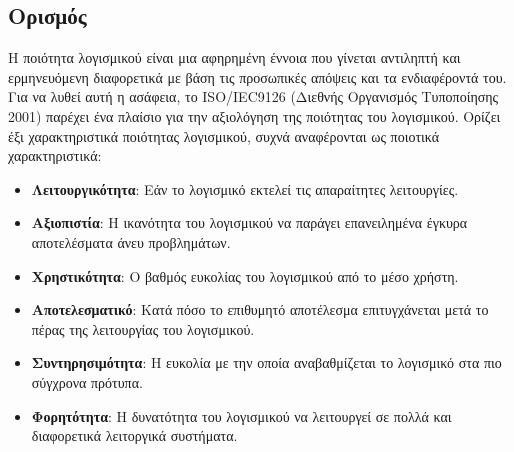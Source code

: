 \documentclass{article}
\begin{document}
{{\subsection{Ορισμός}
Η ποιότητα λογισμικού είναι μια αφηρημένη έννοια που γίνεται αντιληπτή και ερμηνευόμενη διαφορετικά
με βάση τις προσωπικές απόψεις και τα ενδιαφέροντά του. Για να λυθεί αυτή η ασάφεια, το \textlatin{ISO/IEC9126} (Διεθνής Οργανισμός Τυποποίησης 2001) παρέχει ένα πλαίσιο για
την αξιολόγηση της ποιότητας του λογισμικού. Ορίζει έξι χαρακτηριστικά ποιότητας λογισμικού, συχνά
αναφέρονται ως ποιοτικά χαρακτηριστικά:
\begin{itemize}
\item \textbf{Λειτουργικότητα}: Εάν το λογισμικό εκτελεί τις απαραίτητες λειτουργίες.
\item \textbf{Αξιοπιστία}: Η ικανότητα του λογισμικού να παράγει επανειλημένα έγκυρα αποτελέσματα άνευ προβλημάτων.
\item \textbf{Χρηστικότητα}: Ο βαθμός ευκολίας του λογισμικού από το μέσο χρήστη.
\item \textbf{Αποτελεσματικό}: Κατά πόσο το επιθυμητό αποτέλεσμα επιτυγχάνεται μετά το πέρας της λειτουργίας του λογισμικού.
\item \textbf{Συντηρησιμότητα}: Η ευκολία με την οποία αναβαθμίζεται το λογισμικό στα πιο σύγχρονα πρότυπα.
\item \textbf{Φορητότητα}: Η δυνατότητα του λογισμικού να λειτουργεί σε πολλά και διαφορετικά λειτοργικά συστήματα.
\end{itemize}

}}
\end{document}
